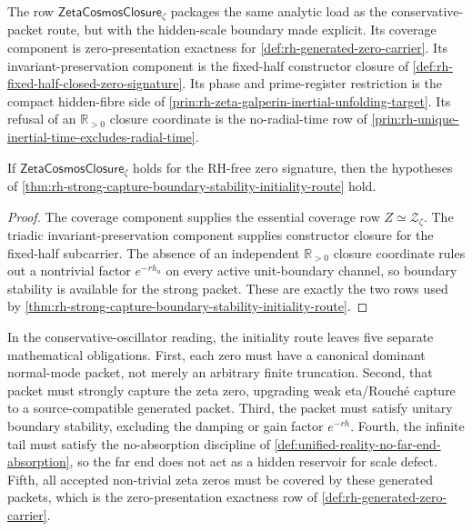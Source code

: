 \begin{principle}
\label{prin:rh-cosmos-closure-absorbs-strong-route-obligations}
The row $\mathsf{ZetaCosmosClosure}_{\zeta}$ packages the same analytic
load as the conservative-packet route, but with the hidden-scale boundary
made explicit. Its coverage component is zero-presentation exactness for
\autoref{def:rh-generated-zero-carrier}. Its invariant-preservation
component is the fixed-half constructor closure of
\autoref{def:rh-fixed-half-closed-zero-signature}. Its phase and
prime-register restriction is the compact hidden-fibre side of
\autoref{prin:rh-zeta-galperin-inertial-unfolding-target}. Its refusal of
an $\mathbb R_{>0}$ closure coordinate is the no-radial-time row of
\autoref{prin:rh-unique-inertial-time-excludes-radial-time}.
\end{principle}

\begin{corollary}
\label{cor:rh-cosmos-closure-conditionally-sufficient}
If $\mathsf{ZetaCosmosClosure}_{\zeta}$ holds for the RH-free zero
signature, then the hypotheses of
\autoref{thm:rh-strong-capture-boundary-stability-initiality-route} hold.
\end{corollary}

\begin{proof}
The coverage component supplies the essential coverage row
$Z\simeq\mathcal Z_{\zeta}$. The triadic invariant-preservation component
supplies constructor closure for the fixed-half subcarrier. The absence
of an independent $\mathbb R_{>0}$ closure coordinate rules out a
nontrivial factor $e^{-r h_a}$ on every active unit-boundary channel, so
boundary stability is available for the strong packet. These are exactly
the two rows used by
\autoref{thm:rh-strong-capture-boundary-stability-initiality-route}.
\end{proof}

\begin{principle}
\label{prin:rh-physical-gap-inventory}
In the conservative-oscillator reading, the initiality route leaves five
separate mathematical obligations. First, each zero must have a canonical
dominant normal-mode packet, not merely an arbitrary finite truncation.
Second, that packet must strongly capture the zeta zero, upgrading weak
eta/Rouch\'e capture to a source-compatible generated packet. Third, the
packet must satisfy unitary boundary stability, excluding the damping or
gain factor $e^{-r h}$. Fourth, the infinite tail must satisfy the
no-absorption discipline of
\autoref{def:unified-reality-no-far-end-absorption}, so the far end does
not act as a hidden reservoir for scale defect. Fifth, all accepted
non-trivial zeta zeros must be covered by these generated packets, which
is the zero-presentation exactness row of
\autoref{def:rh-generated-zero-carrier}.
\end{principle}

